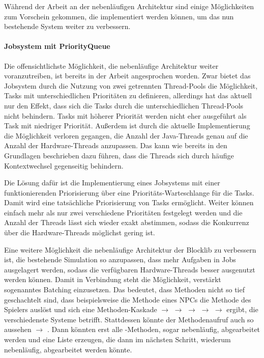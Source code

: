Während der Arbeit an der nebenläufigen Architektur sind einige Möglichkeiten zum Vorschein gekommen, die implementiert werden können, um das nun bestehende System weiter zu verbessern.
\paragraph{Jobsystem mit PriorityQueue}
Die offensichtlichste Möglichkeit, die nebenläufige Architektur weiter voranzutreiben, ist bereits in der Arbeit angesprochen worden. Zwar bietet das Jobsystem durch die Nutzung von zwei getrennten Thread-Pools die Möglichkeit, Tasks mit unterschiedlichen Prioritäten zu definieren, allerdings hat das aktuell nur den Effekt, dass sich die Tasks durch die unterschiedlichen Thread-Pools nicht behindern. Tasks mit höherer Priorität werden nicht eher ausgeführt als Task mit niedriger Priorität. Außerdem ist durch die aktuelle Implementierung die Möglichkeit verloren gegangen, die Anzahl der Java-Threads genau auf die Anzahl der Hardware-Threads anzupassen. Das kann wie bereits in den Grundlagen beschrieben dazu führen, dass die Threads sich durch häufige Kontextwechsel gegenseitig behindern.

Die Lösung dafür ist die Implementierung eines Jobsystems mit einer funktionierenden Priorisierung über eine Prioritäts-Warteschlange für die Tasks. Damit wird eine tatsächliche Priorisierung von Tasks ermöglicht. Weiter können einfach mehr als nur zwei verschiedene Prioritäten festgelegt werden und die Anzahl der Threads lässt sich wieder exakt abstimmen, sodass die Konkurrenz über die Hardware-Threads möglichst gering ist.

Eine weitere Möglichkeit die nebenläufige Architektur der Blocklib zu verbessern ist, die bestehende Simulation so anzupassen, dass mehr Aufgaben in Jobs ausgelagert werden, sodass die verfügbaren Hardware-Threads besser ausgenutzt werden können. Damit in Verbindung steht die Möglichkeit, verstärkt sogenanntes Batching einzusetzen. Das bedeutet, dass Methoden nicht so tief geschachtelt sind, dass beispielsweise die  Methode eines NPCs die  Methode des Spielers auslöst und sich eine Methoden-Kaskade  $\to$  $\to$  $\to$  $\to$  $\to$  ergibt, die verschiedenste Systeme betrifft. Stattdessen könnte der Methodenaufruf auch so aussehen  $\to$ . Dann könnten erst alle 
-Methoden, sogar nebenläufig, abgearbeitet werden und eine Liste erzeugen, die dann im nächsten Schritt, wiederum nebenläufig, abgearbeitet werden könnte. 

